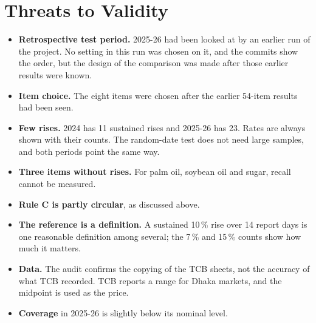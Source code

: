 \section{Threats to Validity}\label{sec:threats}
\begin{itemize}[leftmargin=*,itemsep=2pt]
\item \textbf{Retrospective test period.} 2025-26 had been looked at by an earlier run of the project. No setting in this run was chosen on it, and the commits show the order, but the design of the comparison was made after those earlier results were known.
\item \textbf{Item choice.} The eight items were chosen after the earlier 54-item results had been seen.
\item \textbf{Few rises.} 2024 has 11 sustained rises and 2025-26 has 23. Rates are always shown with their counts. The random-date test does not need large samples, and both periods point the same way.
\item \textbf{Three items without rises.} For palm oil, soybean oil and sugar, recall cannot be measured.
\item \textbf{Rule C is partly circular}, as discussed above.
\item \textbf{The reference is a definition.} A sustained 10\,\% rise over 14 report days is one reasonable definition among several; the 7\,\% and 15\,\% counts show how much it matters.
\item \textbf{Data.} The audit confirms the copying of the TCB sheets, not the accuracy of what TCB recorded. TCB reports a range for Dhaka markets, and the midpoint is used as the price.
\item \textbf{Coverage} in 2025-26 is slightly below its nominal level.
\end{itemize}
